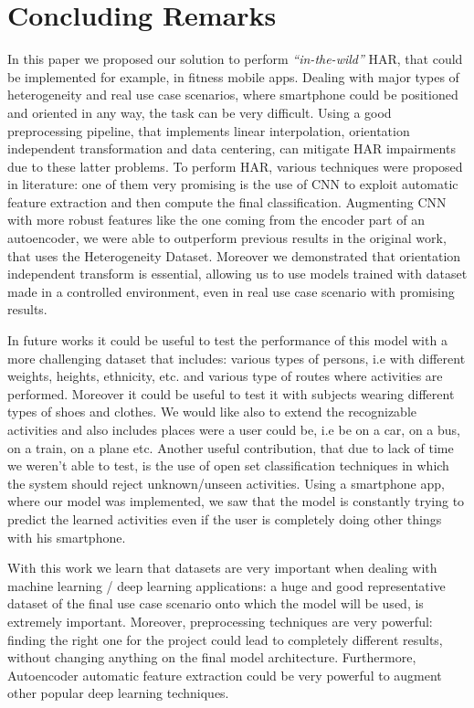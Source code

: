 
\section{Concluding Remarks}
\label{sec:concluding-remarks}

In this paper we proposed our solution to perform \textit{``in-the-wild''} HAR, that could be implemented for example, in fitness mobile apps. Dealing with major types of heterogeneity and real use case scenarios, where smartphone could be positioned and oriented in any way, the task can be very difficult. Using a good preprocessing pipeline, that implements linear interpolation, orientation independent transformation and data centering, can mitigate HAR impairments due to these latter problems. To perform HAR, various techniques were proposed in literature: one of them very promising is the use of CNN to exploit automatic feature extraction and then compute the final classification. Augmenting CNN with more robust features like the one coming from the encoder part of an autoencoder, we were able to outperform previous results in the original work, that uses the Heterogeneity Dataset. Moreover we demonstrated that orientation independent transform is essential, allowing us to use models trained with dataset made in a controlled environment, even in real use case scenario with promising results. 

In future works it could be useful to test the performance of this model with a more challenging dataset that includes: various types of persons, i.e with different weights, heights, ethnicity, etc. and various type of routes where activities are performed. Moreover it could be useful to test it with subjects wearing different types of shoes and clothes. We would like also to extend the recognizable activities and also includes places were a user could be, i.e be on a car, on a bus, on a train, on a plane etc. Another useful contribution, that due to lack of time we weren't able to test, is the use of open set classification techniques in which the system should reject unknown/unseen activities. Using a smartphone app, where our model was implemented, we saw that the model is constantly trying to predict the learned activities even if the user is completely doing other things with his smartphone.

With this work we learn that datasets are very important when dealing with machine learning / deep learning applications: a huge and good representative dataset of the final use case scenario onto which the model will be used, is extremely important. Moreover, preprocessing techniques are very powerful: finding the right one for the project could lead to completely different results, without changing anything on the final model architecture. Furthermore, Autoencoder automatic feature extraction could be very powerful to augment other popular deep learning techniques.


